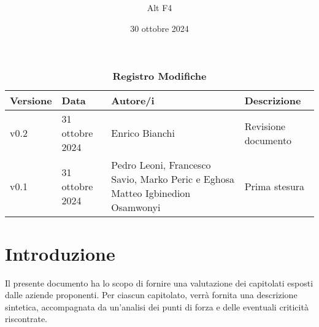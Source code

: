 \documentclass[a4paper, 12pt]{article}
\title{\Huge \textbf{\titolo}}
\author{\Large{Alt} \raisebox{0.3ex}{\normalsize  +} \Large{F4}}
\date{30 ottobre 2024}
\def\logo{./Immagini/logo.jpeg}
\def\ultima-versione{v0.2}
\begin{document}
\begin{titlepage}      
    \maketitle
    \thispagestyle{empty}  

\end{titlepage}

\tableofcontents

\newpage

\begin{table}[!h]
    \centering
    \caption*{\textbf{\Large Registro Modifiche}}
    {\renewcommand{\arraystretch}{2}
    \begin{tabularx}{\textwidth}{| X | X | X | X |}
        \hline
            \textbf{\large Versione} & 
            \textbf{\large Data} & 
            \textbf{\large Autore/i} & 
            \textbf{\large Descrizione} \\ 
        \hline \hline
            \ultima-versione & 
            31 ottobre 2024 & 
            Enrico Bianchi & 
            Revisione documento \\ 
        \hline 
            v0.1 & 
            31 ottobre 2024 & 
            \raggedright Pedro Leoni, Francesco Savio, Marko Peric e Eghosa Matteo Igbinedion Osamwonyi & 
            Prima stesura \\ 
        \hline 
    \end{tabularx}}
\end{table}

\section{Introduzione}
Il presente documento ha lo scopo di fornire una valutazione dei capitolati esposti dalle aziende proponenti.
Per ciascun capitolato, verrà fornita una descrizione sintetica, accompagnata da un’analisi dei punti di forza e delle eventuali criticità riscontrate.
\end{document}
